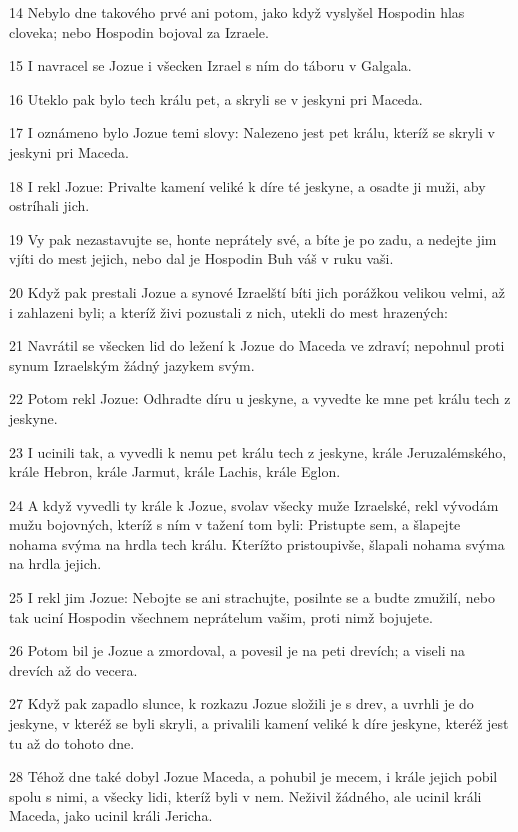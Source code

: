 \par 14 Nebylo dne takového prvé ani potom, jako když vyslyšel Hospodin hlas cloveka; nebo Hospodin bojoval za Izraele.
\par 15 I navracel se Jozue i všecken Izrael s ním do táboru v Galgala.
\par 16 Uteklo pak bylo tech králu pet, a skryli se v jeskyni pri Maceda.
\par 17 I oznámeno bylo Jozue temi slovy: Nalezeno jest pet králu, kteríž se skryli v jeskyni pri Maceda.
\par 18 I rekl Jozue: Privalte kamení veliké k díre té jeskyne, a osadte ji muži, aby ostríhali jich.
\par 19 Vy pak nezastavujte se, honte neprátely své, a bíte je po zadu, a nedejte jim vjíti do mest jejich, nebo dal je Hospodin Buh váš v ruku vaši.
\par 20 Když pak prestali Jozue a synové Izraelští bíti jich porážkou velikou velmi, až i zahlazeni byli; a kteríž živi pozustali z nich, utekli do mest hrazených:
\par 21 Navrátil se všecken lid do ležení k Jozue do Maceda ve zdraví; nepohnul proti synum Izraelským žádný jazykem svým.
\par 22 Potom rekl Jozue: Odhradte díru u jeskyne, a vyvedte ke mne pet králu tech z jeskyne.
\par 23 I ucinili tak, a vyvedli k nemu pet králu tech z jeskyne, krále Jeruzalémského, krále Hebron, krále Jarmut, krále Lachis, krále Eglon.
\par 24 A když vyvedli ty krále k Jozue, svolav všecky muže Izraelské, rekl vývodám mužu bojovných, kteríž s ním v tažení tom byli: Pristupte sem, a šlapejte nohama svýma na hrdla tech králu. Kterížto pristoupivše, šlapali nohama svýma na hrdla jejich.
\par 25 I rekl jim Jozue: Nebojte se ani strachujte, posilnte se a budte zmužilí, nebo tak uciní Hospodin všechnem neprátelum vašim, proti nimž bojujete.
\par 26 Potom bil je Jozue a zmordoval, a povesil je na peti drevích; a viseli na drevích až do vecera.
\par 27 Když pak zapadlo slunce, k rozkazu Jozue složili je s drev, a uvrhli je do jeskyne, v kteréž se byli skryli, a privalili kamení veliké k díre jeskyne, kteréž jest tu až do tohoto dne.
\par 28 Téhož dne také dobyl Jozue Maceda, a pohubil je mecem, i krále jejich pobil spolu s nimi, a všecky lidi, kteríž byli v nem. Neživil žádného, ale ucinil králi Maceda, jako ucinil králi Jericha.
